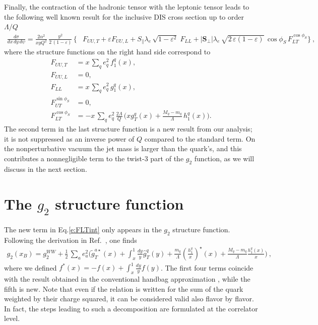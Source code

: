 \documentclass[preprintnumbers,floatfix,nofootinbib]{revtex4}
\newcommand{\xbj}{x}                   %
\newcommand{\mj}{M_q}
\newcommand{\mq}{m_q}
\begin{document}
Finally, the contraction of the hadronic tensor with the leptonic tensor leads
to the following well known result for the inclusive DIS cross section up to order $\Lambda/Q$~\cite{Bacchetta:2006tn}
\begin{align}
\frac{d\sigma}{d\xbj \, dy\, d\psi}
=
\frac{2 \alpha^2}{\xbj y Q^2}\,
\frac{y^2}{2\,(1-\varepsilon)}\, 
\biggl\{
&F_{UU ,T} + \varepsilon F_{UU ,L}
+ S_\parallel \lambda_e\,
  \sqrt{1-\varepsilon^2}\; 
F_{LL}
+ |\bm{S}_\perp| \lambda_e\, \sqrt{2\,\varepsilon (1-\varepsilon)}\, 
  \cos\phi_S\, 
F_{LT}^{\cos \phi_S}
 \biggr\} \ ,
\label{e:crossdis}
\end{align}
where the structure functions on the right hand side correspond to
\begin{align}
F_{UU ,T} &= \xbj\,\sum_q e_q^2\,f_1^q(\xbj),
\\
F_{UU ,L} &= 0,
\\
F_{LL} &=\xbj\,\sum_q e_q^2\,g_1^q(\xbj),
\\
F_{UT}^{\sin \phi_S}&=0,
\label{e:FUTint}
\\
F_{LT}^{\cos \phi_S}&=-\xbj\,\sum_q e_q^2\, \frac{2\Lambda}{Q}\,
\biggl(\xbj  g_T^q(\xbj)
   + \frac{\mj -\mq}{\Lambda} \, h_{1}^q(\xbj) \biggr).
\label{e:FLTint}
\end{align}
The second term in the last structure function is a new result from our
analysis; it is not suppressed as an inverse power of $Q$ compared to the
standard term. On the nonperturbative
vacuum the jet mass is larger than the quark's, and this contributes a
nonnegligible term to the twist-3 part of the $g_2$ function, as we will
discuss in the next section.  

 

\section{The $g_2$ structure function}

The new term in Eq.\eqref{e:FLTint} only appears in the $g_2$ structure function. Following the derivation in Ref.~\cite{Accardi:2009au}, one finds
\begin{align}
\label{e:g2}
  g_2(x_B) = g_2^{WW} + \frac{1}{2}\,\sum_a e_a^2
\biggl(
    \widetilde g_T^{a \star}(x) 
    + \int_x^1\frac{dy}{y} \widehat{g}_T^q(y) 
    + \frac{\mq}{\Lambda} \left(\frac{h_1^q}{x}\right)^\star(x) 
    + \frac{\mj-\mq}{\Lambda} \frac{h_1^q(x)}{x} 
\Biggr) \ ,
\end{align}
where we defined $f^*(x) = -f(x) + \int_x^1\frac{dy}{y} f(y)$. The first four
terms coincide with the result obtained in the conventional handbag
approximation \cite{Accardi:2009au}, while the fifth is new. Note that even if
the relation is written for the sum of the quark weighted by their charge
squared, it can be considered valid also flavor by flavor. In fact, the steps
leading to such a decomposition are formulated at the correlator level.
\end{document}
